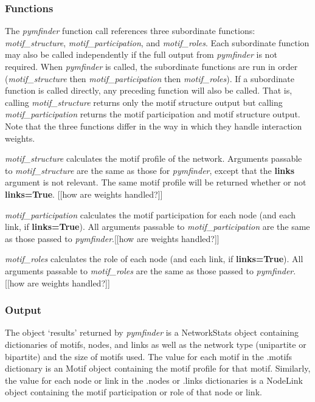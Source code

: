 \documentclass[12pt]{article}
\begin{document}
		\subsubsection{Functions}

			The \emph{pymfinder} function call references three subordinate functions: \emph{motif\_structure}, \emph{motif\_participation}, and \emph{motif\_roles}. Each subordinate function may also be called independently if the full output from \emph{pymfinder} is not required. When \emph{pymfinder} is called, the subordinate functions are run in order (\emph{motif\_structure} then \emph{motif\_participation} then \emph{motif\_roles}). If a subordinate function is called directly, any preceding function will also be called. That is, calling \emph{motif\_structure} returns only the motif structure output but calling \emph{motif\_participation} returns the motif participation and motif structure output. Note that the three functions differ in the way in which they handle interaction weights.


			\emph{motif\_structure} calculates the motif profile of the network. Arguments passable to \emph{motif\_structure} are the same as those for \emph{pymfinder}, except that the \textbf{links} argument is not relevant. The same motif profile will be returned whether or not \textbf{links=True}. [[how are weights handled?]]


			\emph{motif\_participation} calculates the motif participation for each node (and each link, if \textbf{links=True}). All arguments passable to \emph{motif\_participation} are the same as those passed to \emph{pymfinder}.[[how are weights handled?]]


			\emph{motif\_roles} calculates the role of each node (and each link, if \textbf{links=True}). All arguments passable to \emph{motif\_roles} are the same as those passed to \emph{pymfinder}.[[how are weights handled?]]


		\subsubsection{Output}

			The object `results' returned by \emph{pymfinder} is a NetworkStats object containing dictionaries of motifs, nodes, and links as well as the network type (unipartite or bipartite) and the size of motifs used. The value for each motif in the .motifs dictionary is an Motif object containing the motif profile for that motif. Similarly, the value for each node or link in the .nodes or .links dictionaries is a NodeLink object containing the motif participation or role of that node or link.
\end{document}
